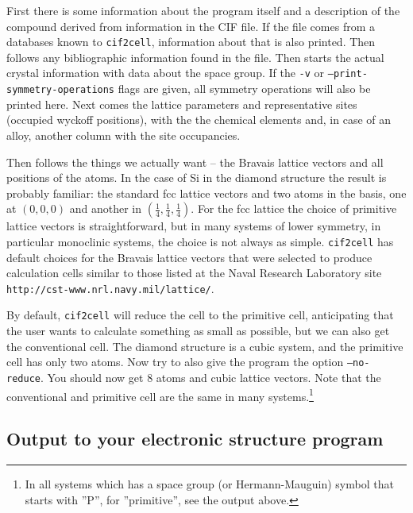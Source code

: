 \documentclass[11pt]{article}
\newcommand{\ciftocell}{\texttt{cif2cell}}
\begin{document}
\newpage
First there is some information about the program itself and a description of the compound derived from information in the CIF file. If the file comes from a databases known to \ciftocell, information about that is also printed. Then follows any bibliographic information found in the file. Then starts the actual crystal information with data about the space group. If the \texttt{-v} or \texttt{--print-symmetry-operations} flags are given, all symmetry operations will also be printed here. Next comes the lattice parameters and representative sites (occupied wyckoff positions), with the the chemical elements and, in case of an alloy, another column with the site occupancies.

Then follows the things we actually want -- the Bravais lattice vectors and all positions of the atoms.  In the case of Si in the diamond structure the result is probably familiar:  the standard fcc lattice vectors and two atoms in the basis, one at $(0,0,0)$ and another in $(\frac{1}{4},\frac{1}{4},\frac{1}{4})$. For the fcc lattice the choice of primitive lattice vectors is straightforward, but in many systems of lower symmetry, in particular monoclinic systems, the choice is not always as simple. \ciftocell{} has default choices for the Bravais lattice vectors that were selected to produce calculation cells similar to those listed at the Naval Research Laboratory site \texttt{http://cst-www.nrl.navy.mil/lattice/}.

By default, \ciftocell{} will reduce the cell to the primitive cell, anticipating that the user wants to calculate something as small as possible, but we can also get the conventional cell. The diamond structure is a cubic system, and the primitive cell has only two atoms. Now try to also give the program the option \texttt{--no-reduce}. You should now get 8 atoms and cubic lattice vectors. Note that the conventional and primitive cell are the same in many systems.\footnote{In all systems which has a space group (or Hermann-Mauguin) symbol that starts with ''P'', for ''primitive'', see the output above.}

\subsection{Output to your electronic structure program}
\end{document}
